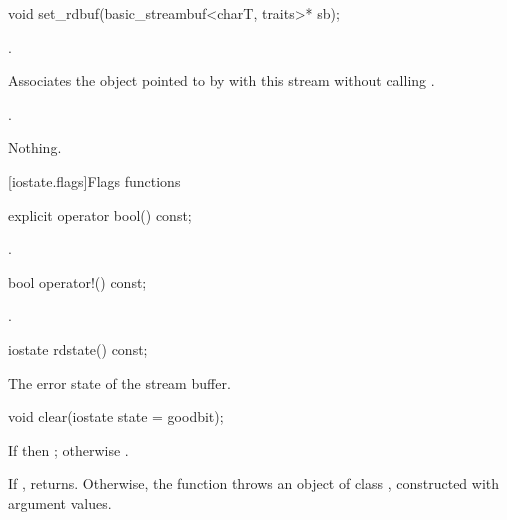 %
\begin{itemdecl}
void set_rdbuf(basic_streambuf<charT, traits>* sb);
\end{itemdecl}

\begin{itemdescr}
\pnum
\requires {}.

\pnum
\effects Associates the  object
pointed to by  with this stream without calling
.

\pnum
\ensures {}.

\pnum
\throws Nothing.
\end{itemdescr}

[iostate.flags]{Flags functions}

%
\begin{itemdecl}
explicit operator bool() const;
\end{itemdecl}

\begin{itemdescr}
\pnum
\returns {}.
\end{itemdescr}

%
\begin{itemdecl}
bool operator!() const;
\end{itemdecl}

\begin{itemdescr}
\pnum
\returns
{}.
\end{itemdescr}

%
\begin{itemdecl}
iostate rdstate() const;
\end{itemdecl}

\begin{itemdescr}
\pnum
\returns
The error state of the stream buffer.
\end{itemdescr}

%
\begin{itemdecl}
void clear(iostate state = goodbit);
\end{itemdecl}

\begin{itemdescr}
\pnum
\ensures
If
then
;
otherwise
.

\pnum
\effects
If ,
returns.
Otherwise, the function throws an object of class
,
constructed with
argument values.%
\end{itemdescr}


